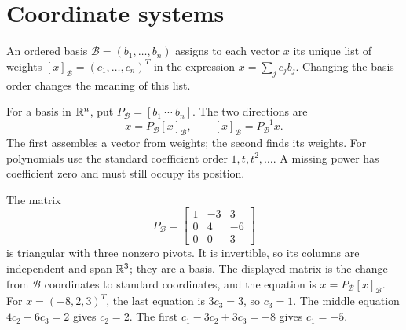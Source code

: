 \section{Coordinate systems}
An ordered basis $\mathcal B=(b_1,\ldots,b_n)$ assigns to each vector
$x$ its unique list of weights $[x]_{\mathcal B}=(c_1,\ldots,c_n)^T$
in the expression $x=\sum_jc_jb_j$. Changing the basis order changes
the meaning of this list.

For a basis in $\mathbb{R}^n$, put $P_{\mathcal B}=[b_1\ \cdots\ b_n]$.
The two directions are
\[
x=P_{\mathcal B}[x]_{\mathcal B},\qquad
[x]_{\mathcal B}=P_{\mathcal B}^{-1}x.
\]
The first assembles a vector from weights; the second finds its weights.
For polynomials use the standard coefficient order $1,t,t^2,\ldots$.
A missing power has coefficient zero and must still occupy its position.

The matrix
\[
P_{\mathcal B}=\begin{bmatrix}1&-3&3\\0&4&-6\\0&0&3\end{bmatrix}
\]
is triangular with three nonzero pivots. It is invertible, so its columns
are independent and span $\mathbb{R}^3$; they are a basis.
The displayed matrix is the change from $\mathcal B$ coordinates to
standard coordinates, and the equation is $x=P_{\mathcal B}[x]_{\mathcal B}$.
For $x=(-8,2,3)^T$, the last equation is $3c_3=3$, so $c_3=1$.
The middle equation $4c_2-6c_3=2$ gives $c_2=2$.
The first $c_1-3c_2+3c_3=-8$ gives $c_1=-5$.

